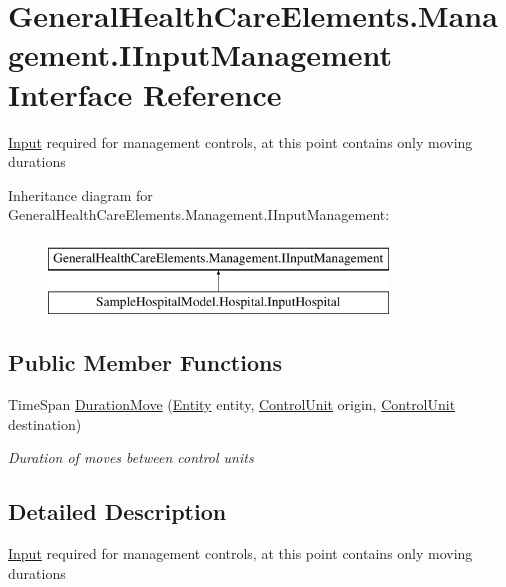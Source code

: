 \hypertarget{interface_general_health_care_elements_1_1_management_1_1_i_input_management}{}\section{General\+Health\+Care\+Elements.\+Management.\+I\+Input\+Management Interface Reference}
\label{interface_general_health_care_elements_1_1_management_1_1_i_input_management}


\hyperlink{namespace_general_health_care_elements_1_1_input}{Input} required for management controls, at this point contains only moving durations  


Inheritance diagram for General\+Health\+Care\+Elements.\+Management.\+I\+Input\+Management\+:\begin{figure}[H]
\begin{center}
\leavevmode
\includegraphics[height=2.000000cm]{interface_general_health_care_elements_1_1_management_1_1_i_input_management}
\end{center}
\end{figure}
\subsection*{Public Member Functions}
\begin{DoxyCompactItemize}
\item 
Time\+Span \hyperlink{interface_general_health_care_elements_1_1_management_1_1_i_input_management_adba46c9c21f2d4646a251efec279cec7}{Duration\+Move} (\hyperlink{class_simulation_core_1_1_h_c_c_m_elements_1_1_entity}{Entity} entity, \hyperlink{class_simulation_core_1_1_h_c_c_m_elements_1_1_control_unit}{Control\+Unit} origin, \hyperlink{class_simulation_core_1_1_h_c_c_m_elements_1_1_control_unit}{Control\+Unit} destination)
\begin{DoxyCompactList}\small\item\em Duration of moves between control units \end{DoxyCompactList}\end{DoxyCompactItemize}


\subsection{Detailed Description}
\hyperlink{namespace_general_health_care_elements_1_1_input}{Input} required for management controls, at this point contains only moving durations 



